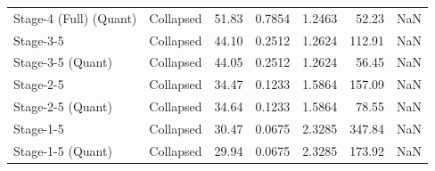 \begin{table}
\begin{tabular}{llrrrrl}
Stage-4 (Full)
(Quant) & Collapsed & 51.83 & 0.7854 & 1.2463 & 52.23 & NaN \\
Stage-3-5 & Collapsed & 44.10 & 0.2512 & 1.2624 & 112.91 & NaN \\
Stage-3-5
(Quant) & Collapsed & 44.05 & 0.2512 & 1.2624 & 56.45 & NaN \\
Stage-2-5 & Collapsed & 34.47 & 0.1233 & 1.5864 & 157.09 & NaN \\
Stage-2-5
(Quant) & Collapsed & 34.64 & 0.1233 & 1.5864 & 78.55 & NaN \\
Stage-1-5 & Collapsed & 30.47 & 0.0675 & 2.3285 & 347.84 & NaN \\
Stage-1-5
(Quant) & Collapsed & 29.94 & 0.0675 & 2.3285 & 173.92 & NaN \\
\bottomrule
\end{tabular}
\end{table}
